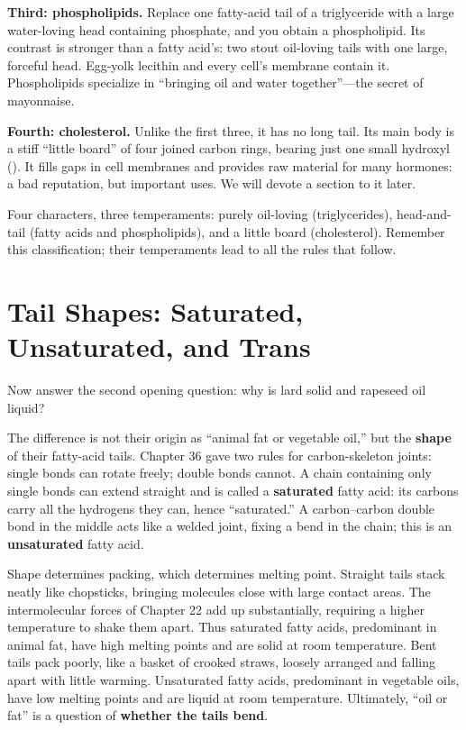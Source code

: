 \textbf{Third: phospholipids.} Replace one fatty-acid tail of a triglyceride with a large water-loving head containing phosphate, and you obtain a phospholipid. Its contrast is stronger than a fatty acid's: two stout oil-loving tails with one large, forceful head. Egg-yolk lecithin and every cell's membrane contain it. Phospholipids specialize in ``bringing oil and water together''---the secret of mayonnaise.

\textbf{Fourth: cholesterol.} Unlike the first three, it has no long tail. Its main body is a stiff ``little board'' of four joined carbon rings, bearing just one small hydroxyl (). It fills gaps in cell membranes and provides raw material for many hormones: a bad reputation, but important uses. We will devote a section to it later.

Four characters, three temperaments: purely oil-loving (triglycerides), head-and-tail (fatty acids and phospholipids), and a little board (cholesterol). Remember this classification; their temperaments lead to all the rules that follow.

\section{Tail Shapes: Saturated, Unsaturated, and Trans}

Now answer the second opening question: why is lard solid and rapeseed oil liquid?

The difference is not their origin as ``animal fat or vegetable oil,'' but the \textbf{shape} of their fatty-acid tails. Chapter 36 gave two rules for carbon-skeleton joints: single bonds can rotate freely; double bonds cannot. A chain containing only single bonds can extend straight and is called a \textbf{saturated} fatty acid: its carbons carry all the hydrogens they can, hence ``saturated.'' A carbon--carbon double bond in the middle acts like a welded joint, fixing a bend in the chain; this is an \textbf{unsaturated} fatty acid.

Shape determines packing, which determines melting point. Straight tails stack neatly like chopsticks, bringing molecules close with large contact areas. The intermolecular forces of Chapter 22 add up substantially, requiring a higher temperature to shake them apart. Thus saturated fatty acids, predominant in animal fat, have high melting points and are solid at room temperature. Bent tails pack poorly, like a basket of crooked straws, loosely arranged and falling apart with little warming. Unsaturated fatty acids, predominant in vegetable oils, have low melting points and are liquid at room temperature. Ultimately, ``oil or fat'' is a question of \textbf{whether the tails bend}.

